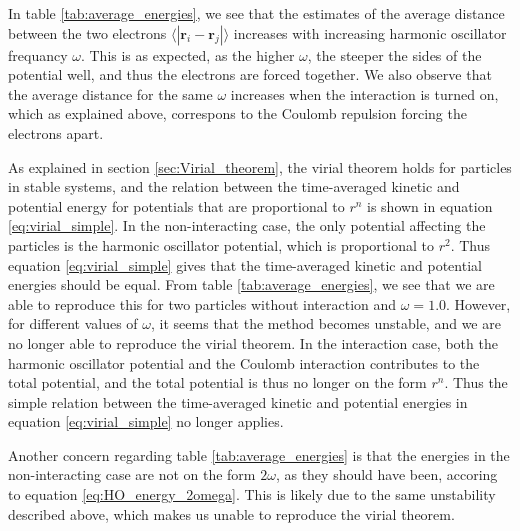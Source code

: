 \documentclass[norsk,a4paper,12pt]{article}
\begin{document}
In table \ref{tab:average_energies}, we see that the estimates of the average distance between the two electrons $\langle |\boldsymbol{r}_i-\boldsymbol{r}_j|\rangle$ increases with increasing harmonic oscillator frequancy $\omega$. This is as expected, as the higher $\omega$, the steeper the sides of the potential well, and thus the electrons are forced together. We also observe that the average distance for the same $\omega$ increases when the interaction is turned on, which as explained above, correspons to the Coulomb repulsion forcing the electrons apart.
\par 
\vspace{3mm}

As explained in section \ref{sec:Virial_theorem}, the virial theorem holds for particles in stable systems, and the relation between the time-averaged kinetic and potential energy for potentials that are proportional to $r^n$ is shown in equation \ref{eq:virial_simple}. In the non-interacting case, the only potential affecting the particles is the harmonic oscillator potential, which is proportional to $r^2$. Thus equation \ref{eq:virial_simple} gives that the time-averaged kinetic and potential energies should be equal. From table \ref{tab:average_energies}, we see that we are able to reproduce this for two particles without interaction and $\omega=1.0$. However, for different values of $\omega$, it seems that the method becomes unstable, and we are no longer able to reproduce the virial theorem. In the interaction case, both the harmonic oscillator potential and the Coulomb interaction contributes to the total potential, and the total potential is thus no longer on the form $r^n$. Thus the simple relation between the time-averaged kinetic and potential energies in equation \ref{eq:virial_simple} no longer applies.
\par 
\vspace{3mm}

Another concern regarding table \ref{tab:average_energies} is that the energies in the non-interacting case are not on the form $2 \omega$, as they should have been, accoring to equation \ref{eq:HO_energy_2omega}. This is likely due to the same unstability described above, which makes us unable to reproduce the virial theorem. 
\end{document}
